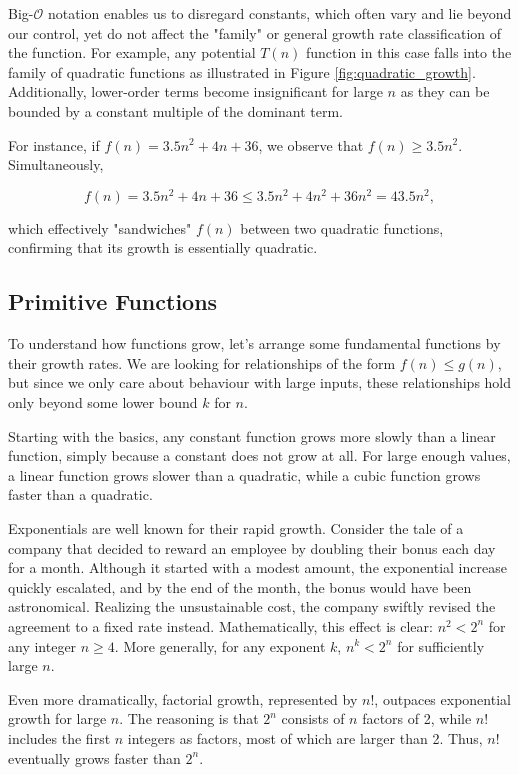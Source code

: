 Big-$\mathcal{O}$ notation enables us to disregard constants, which often vary and lie beyond our control, yet do not affect the "family" or general growth rate classification of the function. For example, any potential $T(n)$ function in this case falls into the family of quadratic functions as illustrated in Figure \ref{fig:quadratic_growth}. Additionally, lower-order terms become insignificant for large $n$ as they can be bounded by a constant multiple of the dominant term. 

For instance, if $f(n) = 3.5n^2 + 4n + 36$, we observe that $f(n) \geq 3.5n^2$. Simultaneously,

\[
f(n) = 3.5n^2 + 4n + 36 \leq 3.5n^2 + 4n^2 + 36n^2 = 43.5n^2,
\]

which effectively "sandwiches" $f(n)$ between two quadratic functions, confirming that its growth is essentially quadratic.

\subsection*{Primitive Functions}
To understand how functions grow, let’s arrange some fundamental functions by their growth rates. We are looking for relationships of the form \( f(n) \leq g(n) \), but since we only care about behaviour with large inputs, these relationships hold only beyond some lower bound \( k \) for \( n \).

Starting with the basics, any constant function grows more slowly than a linear function, simply because a constant does not grow at all. For large enough values, a linear function grows slower than a quadratic, while a cubic function grows faster than a quadratic.

Exponentials are well known for their rapid growth. Consider the tale of a company that decided to reward an employee by doubling their bonus each day for a month. Although it started with a modest amount, the exponential increase quickly escalated, and by the end of the month, the bonus would have been astronomical. Realizing the unsustainable cost, the company swiftly revised the agreement to a fixed rate instead. Mathematically, this effect is clear: \( n^2 < 2^n \) for any integer \( n \geq 4 \). More generally, for any exponent \( k \), \( n^k < 2^n \) for sufficiently large \( n \).

Even more dramatically, factorial growth, represented by \( n! \), outpaces exponential growth for large \( n \). The reasoning is that \( 2^n \) consists of \( n \) factors of 2, while \( n! \) includes the first \( n \) integers as factors, most of which are larger than 2. Thus, \( n! \) eventually grows faster than \( 2^n \). 

